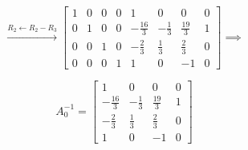 \begin{answer}
    $$
    \xrightarrow{R_2\leftarrow R_2-R_3}
    \left[
    \begin{array}{cccc|cccc}
        1 & 0 & 0 & 0 & 1 & 0 & 0 & 0\\
        0 & 1 & 0 & 0 & -\frac{16}{3} & -\frac13 & \frac{19}{3} & 1\\
        0 & 0 & 1 & 0 & -\frac23 & \frac13 & \frac23 & 0\\
        0 & 0 & 0 & 1 & 1 & 0 & -1 & 0
    \end{array}
    \right]
    \implies
    $$

    $$
    \boxed{
    A_0^{-1}=
    \begin{bmatrix}
        1 & 0 & 0 & 0\\
        -\frac{16}{3} & -\frac13 & \frac{19}{3} & 1\\
        -\frac23 & \frac13 & \frac23 & 0\\
        1 & 0 & -1 & 0
    \end{bmatrix}
    }
    $$
\end{answer}
